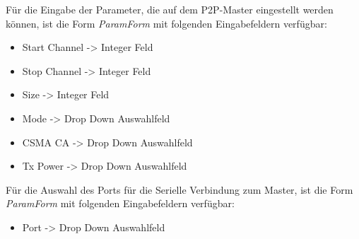 Für die Eingabe der Parameter, die auf dem P2P-Master eingestellt werden können, ist die Form \textit{ParamForm} mit folgenden Eingabefeldern verfügbar:
\begin{itemize}
	\item Start Channel \hspace{5mm} -> Integer Feld
	\item Stop Channel \hspace{6mm} -> Integer Feld
	\item Size \hspace{22.3mm} -> Integer Feld
	\item Mode \hspace{19.5mm} -> Drop Down Auswahlfeld
	\item CSMA CA \hspace{10mm} -> Drop Down Auswahlfeld
	\item Tx Power \hspace{13mm} -> Drop Down Auswahlfeld
\end{itemize}

\vspace{3mm}
Für die Auswahl des Ports für die Serielle Verbindung zum Master, ist die Form \textit{ParamForm} mit folgenden Eingabefeldern verfügbar:
\begin{itemize}
	\item  Port \hspace{22mm} -> Drop Down Auswahlfeld
\end{itemize}

